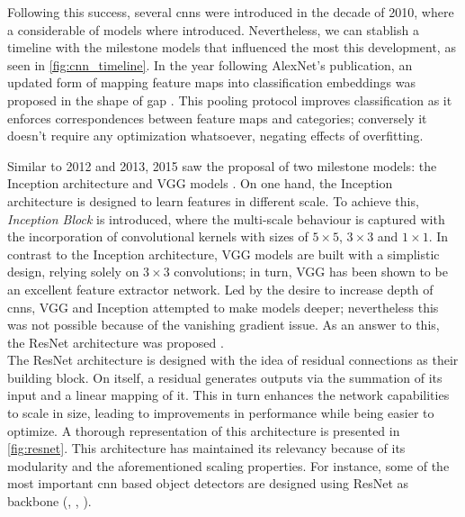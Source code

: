 \noindent Following this success, several \glspl{cnn} were introduced in the decade of 2010, where 
a considerable of models where introduced. Nevertheless, we can stablish a timeline with the 
milestone models that influenced the most this development, as seen in \autoref{fig:cnn_timeline}.
In the year following AlexNet's publication, an updated form of mapping feature maps into 
classification embeddings was proposed  in the shape of \gls{gap} \autocite{lin2013network}. 
This pooling protocol improves classification as it enforces correspondences between feature maps 
and categories; conversely it doesn't require any optimization whatsoever, negating effects of 
overfitting. 



Similar to 2012 and 2013, 2015 saw the proposal of two milestone models: the Inception architecture 
\autocite{szegedy2015going} and VGG models \autocite{simonyan2015deep}. On one hand, the Inception 
architecture is designed to learn features in different scale. To achieve this, \emph{Inception 
Block} is introduced, where the multi-scale behaviour is captured with the incorporation of 
convolutional kernels with sizes of $5\times5$, $3\times 3$ and $1\times1$. In contrast to 
the Inception architecture, VGG models are built with a simplistic design, relying solely on 
$3\times 3$ convolutions; in turn, VGG has been shown to be an excellent feature extractor network. 
Led by the desire to increase depth of \glspl{cnn}, VGG and Inception attempted to make models 
deeper; nevertheless this was not possible because of the vanishing gradient issue. As an answer to 
this, the ResNet architecture was proposed \autocite{he2016deep}.\\


%
\noindent The ResNet architecture is designed with the idea of residual connections as their 
building block. On itself, a residual generates outputs via the summation of its input and a 
linear mapping of it. This in turn enhances the network capabilities to scale in size, leading to 
improvements in performance while being easier to optimize. A thorough representation of this 
architecture is presented in \autoref{fig:resnet}. 
This architecture has maintained its relevancy because of its modularity and the aforementioned 
scaling properties. For instance, some of the most important \gls{cnn} based object detectors are 
designed using ResNet as backbone (\cite{ren2015faster}, \cite{lin2017focal}, \cite{he2017mask}). 

